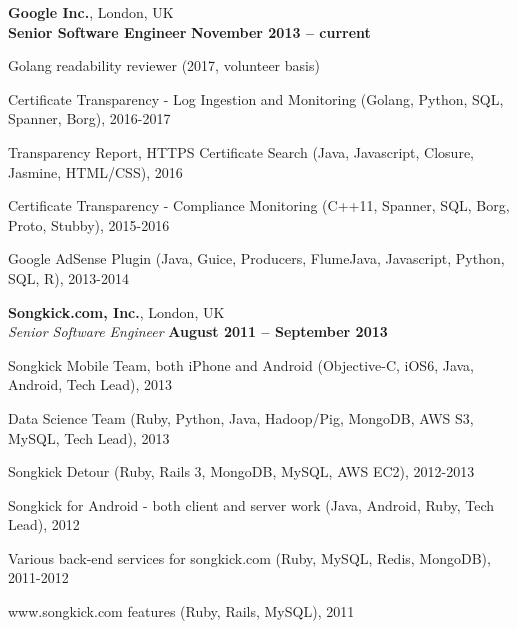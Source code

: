 \documentclass[line]{resume}
\begin{document}
\begin{resume}
    \textbf{Google Inc.}, London, UK \vspace{2mm}\\\vspace{1mm}%
    \textbf{Senior Software Engineer} \hfill \textbf{November 2013 -- current}\vspace{-3mm}\\\vspace{-1mm}%
    \begin{list2}
        \item Golang readability reviewer (2017, volunteer basis)
        \item Certificate Transparency - Log Ingestion and Monitoring (Golang, Python, SQL, Spanner, Borg), 2016-2017
        \item Transparency Report, HTTPS Certificate Search (Java, Javascript, Closure, Jasmine, HTML/CSS), 2016
        \item Certificate Transparency - Compliance Monitoring (C++11, Spanner, SQL, Borg, Proto, Stubby), 2015-2016
        \item Google AdSense Plugin (Java, Guice, Producers, FlumeJava, Javascript, Python, SQL, R), 2013-2014
    \end{list2}\vspace{-1.5mm}

    \textbf{Songkick.com, Inc.}, London, UK \vspace{2mm}\\\vspace{1mm}%
    \textsl{Senior Software Engineer} \hfill \textbf{August 2011 -- September 2013}\vspace{-3mm}\\\vspace{-1mm}%
    \begin{list2}
        \item Songkick Mobile Team, both iPhone and Android (Objective-C, iOS6, Java, Android, Tech Lead), 2013
        \item Data Science Team (Ruby, Python, Java, Hadoop/Pig, MongoDB, AWS S3, MySQL, Tech Lead), 2013
        \item Songkick Detour (Ruby, Rails 3, MongoDB, MySQL, AWS EC2), 2012-2013
        \item Songkick for Android - both client and server work (Java, Android, Ruby, Tech Lead), 2012 
        \item Various back-end services for songkick.com (Ruby, MySQL, Redis, MongoDB), 2011-2012
        \item www.songkick.com features (Ruby, Rails, MySQL), 2011
    \end{list2}\vspace{-1.5mm}
    

\end{resume}
\end{document}
